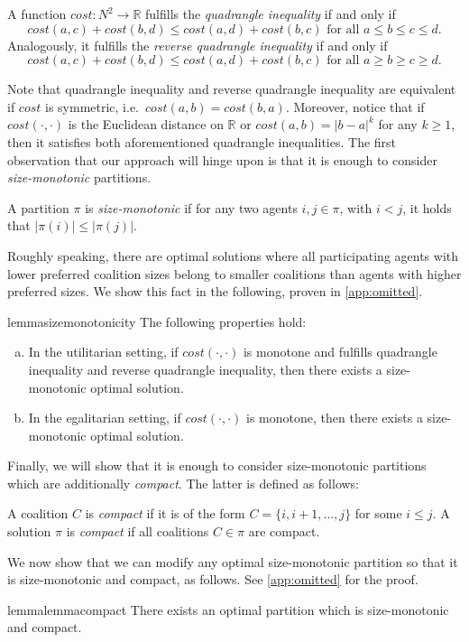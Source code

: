 \documentclass[a4paper,UKenglish,cleveref, autoref, thm-restate]{lipics-v2021}
\newcommand{\cost}{\mathit{cost}}
\begin{document}
\begin{definition}
    A function $\cost: N^2 \rightarrow \mathbb{R}$ fulfills the \emph{quadrangle inequality} if and only if
    \[\cost(a,c) + \cost(b,d) \leq \cost(a,d) + \cost(b,c)\text{ for all } a \leq b \leq c \leq d.\]
    Analogously, it fulfills the \emph{reverse quadrangle inequality} if and only if 
    \[\cost(a,c) + \cost(b,d) \leq \cost(a,d) + \cost(b,c)\text{ for all } a \geq b \geq c \geq d.\]
\end{definition}
Note that quadrangle inequality and reverse quadrangle inequality are equivalent if $\cost$ is symmetric, i.e.\ $\cost(a,b) = \cost(b,a)$. Moreover, notice that if $cost(\cdot,\cdot)$ is the Euclidean distance on $\mathbb{R}$ or $\cost(a,b)=|b-a|^k$ for any $k\geq 1$, then it satisfies both aforementioned quadrangle inequalities.
The first observation that our approach will hinge upon is that it is enough to consider \emph{size-monotonic} partitions. 
\begin{definition}
A partition $\pi$ is \emph{size-monotonic} if for any two agents $i, j \in \pi$, with $i < j$, it holds that $|\pi(i)| \leq |\pi(j)|.$
\end{definition}
Roughly speaking, there are optimal solutions where all participating agents with lower preferred coalition sizes belong to smaller coalitions than agents with higher preferred sizes. We show this fact in the following, proven in \cref{app:omitted}.
\begin{restatable}{lemma}{sizemonotonicity}
\label{lemma:size-monotonic} The following properties hold:
\begin{enumerate}[(a)]
    \item In the utilitarian setting, if $\cost(\cdot,\cdot)$ is monotone and fulfills quadrangle inequality and reverse quadrangle inequality, then there exists a size-monotonic optimal solution.
    \item In the egalitarian setting, if $\cost(\cdot,\cdot)$ is monotone, then there exists a size-monotonic optimal solution.
\end{enumerate}

\end{restatable}
\noindent Finally, we will show that it is enough to consider size-monotonic partitions which are additionally \emph{compact}. The latter is defined as follows:
\begin{definition}[Compactness]
A coalition $C$ is \emph{compact} if it is of the form $C = \{i, i + 1, \ldots, j\}$ for some $i \leq j.$ A solution $\pi$ is \emph{compact} if all coalitions $C \in \pi$ are compact.
\end{definition}
We now show that we can modify any optimal size-monotonic partition so that it is size-monotonic and compact, as follows. See \cref{app:omitted} for the proof. 
\begin{restatable}{lemma}{lemmacompact}\label{lemma:compact} 
There exists an optimal partition which is size-monotonic and compact.
\end{restatable}
\end{document}
